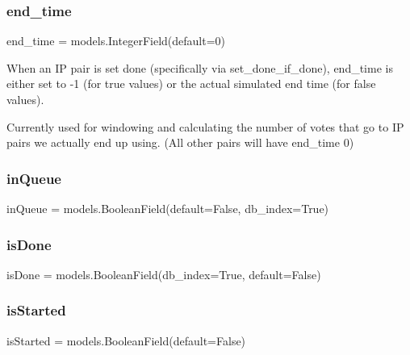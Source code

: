 \subsubsection{\texorpdfstring{end\_time}{end\_time}}
{\footnotesize\ttfamily end\+\_\+time = models.\+Integer\+Field(default=0)\hspace{0.3cm}{\ttfamily [static]}}



When an IP pair is set done (specifically via set\+\_\+done\+\_\+if\+\_\+done), end\+\_\+time is either set to -\/1 (for true values) or the actual simulated end time (for false values). 

Currently used for windowing and calculating the number of votes that go to IP pairs we actually end up using. (All other pairs will have end\+\_\+time 0) \mbox{\label{classdynamicfilterapp_1_1models_1_1_i_p___pair_af5ba33bf8fddcc8f610ee2d0091ded53}} 
\subsubsection{\texorpdfstring{inQueue}{inQueue}}
{\footnotesize\ttfamily in\+Queue = models.\+Boolean\+Field(default=False, db\+\_\+index=True)\hspace{0.3cm}{\ttfamily [static]}}

\mbox{\label{classdynamicfilterapp_1_1models_1_1_i_p___pair_a9dde5beb8f6ffe59012e1b7c5ef641ef}} 
\subsubsection{\texorpdfstring{isDone}{isDone}}
{\footnotesize\ttfamily is\+Done = models.\+Boolean\+Field(db\+\_\+index=True, default=False)\hspace{0.3cm}{\ttfamily [static]}}

\mbox{\label{classdynamicfilterapp_1_1models_1_1_i_p___pair_a4dfad4da8b9c480e78a3ad161ce723f1}} 
\subsubsection{\texorpdfstring{isStarted}{isStarted}}
{\footnotesize\ttfamily is\+Started = models.\+Boolean\+Field(default=False)\hspace{0.3cm}{\ttfamily [static]}}

